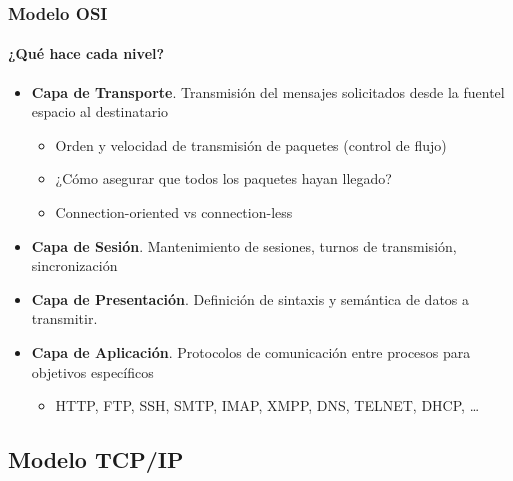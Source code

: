 \documentclass[letter]{beamer}
\begin{document}
\begin{frame}
  \frametitle{Modelo OSI}
  \framesubtitle{¿Qué hace cada nivel?}

  \begin{itemize}
    \item {\bf Capa de Transporte}. Transmisión del mensajes solicitados desde la fuentel espacio al destinatario
      \begin{itemize}
        \item Orden y velocidad de transmisión de paquetes (control de flujo)
        \item ¿Cómo asegurar que todos los paquetes hayan llegado?
        \item Connection-oriented vs connection-less
      \end{itemize}
    \item {\bf Capa de Sesión}. Mantenimiento de sesiones, turnos de transmisión, sincronización
    \item {\bf Capa de Presentación}. Definición de sintaxis y semántica de datos a transmitir.
    \item {\bf Capa de Aplicación}. Protocolos de comunicación entre procesos para objetivos específicos
      \begin{itemize}
        \item HTTP, FTP, SSH, SMTP, IMAP, XMPP, DNS, TELNET, DHCP, \ldots
      \end{itemize}
  \end{itemize}
\end{frame}

\subsection{Modelo TCP/IP}
\end{document}
